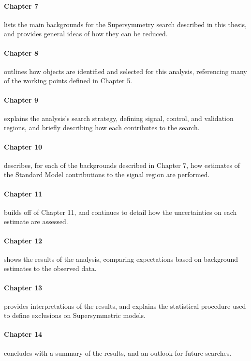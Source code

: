 \paragraph{Chapter 7} lists the main backgrounds for the Supersymmetry search described in this thesis, and provides general ideas of how they can be reduced. 

\paragraph{Chapter 8} outlines how objects are identified and selected for this analysis, referencing many of the working points defined in Chapter 5.  

\paragraph{Chapter 9} explains the analysis's search strategy, defining signal, control, and validation regions, and briefly describing how each contributes to the search.

\paragraph{Chapter 10} describes, for each of the backgrounds described in Chapter 7, how estimates of the Standard Model contributions to the signal region are performed. 

\paragraph{Chapter 11} builds off of Chapter 11, and continues to detail how the uncertainties on each estimate are assessed. 

\paragraph{Chapter 12} shows the results of the analysis, comparing expectations based on background estimates to the observed data. 

\paragraph{Chapter 13} provides interpretations of the results, and explains the statistical procedure used to define exclusions on Supersymmetric models. 

\paragraph{Chapter 14} concludes with a summary of the results, and an outlook for future searches. 
